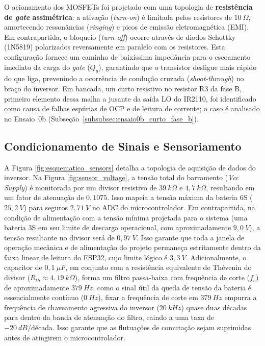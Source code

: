 O acionamento dos MOSFETs foi projetado com uma topologia de \textbf{resistência de \textit{gate} assimétrica}: a ativação (\textit{turn-on}) é limitada pelos resistores de $10 \: \Omega$, amortecendo ressonâncias (\textit{ringing}) e picos de emissão eletromagnética (EMI). Em contrapartida, o bloqueio (\textit{turn-off}) ocorre através de diodos Schottky (1N5819) polarizados reversamente em paralelo com os resistores. Esta configuração fornece um caminho de baixíssima impedância para o escoamento imediato da carga do \textit{gate} ($Q_g$), garantindo que o transistor desligue mais rápido do que liga, prevenindo a ocorrência de condução cruzada (\textit{shoot-through}) no braço do inversor. Em bancada, um curto resistivo no resistor R3 da fase B, primeiro elemento dessa malha a jusante da saída LO do IR2110, foi identificado como causa de falhas espúrias de OCP e de leitura de corrente; o caso é analisado no Ensaio~0b (Subseção~\ref{subsubsec:ensaio0b_curto_fase_b}).

\subsection{Condicionamento de Sinais e Sensoriamento}

A Figura \ref{fig:esquematico_sensors} detalha a topologia de aquisição de dados do inversor. Na Figura \ref{fig:sensor_voltage}, a tensão total do barramento (\textit{Vcc Supply}) é monitorada por um divisor resistivo de $39 \: k\Omega$ e $4,7 \: k\Omega$, resultando em um fator de atenuação de $0,1075$. Isso mapeia a tensão máxima da bateria 6S ($25,2 \: V$) para seguros $2,71 \: V$ no ADC do microcontrolador. Em contrapartida, na condição de alimentação com a tensão mínima projetada para o sistema (uma bateria 3S em seu limite de descarga operacional, com aproximadamente $9,0 \: V$), a tensão resultante no divisor será de $0,97 \: V$. Isso garante que toda a janela de operação mecânica e de alimentação do projeto permaneça estritamente dentro da faixa linear de leitura do ESP32, cujo limite lógico é $3,3 \: V$. Adicionalmente, o capacitor de $0,1 \: \mu F$, em conjunto com a resistência equivalente de Thévenin do divisor ($R_{th} \approx 4,19 \: k\Omega$), forma um filtro passa-baixa com frequência de corte ($f_c$) de aproximadamente $379 \: Hz$, como o sinal útil da queda de tensão da bateria é essencialmente contínuo ($0 \: Hz$), fixar a frequência de corte em $379 \: Hz$ empurra a frequência de chaveamento agressiva do inversor ($20 \: kHz$) quase duas décadas para dentro da banda de atenuação do filtro, caindo a uma taxa de $-20 \: dB/\text{década}$. Isso garante que as flutuações de comutação sejam suprimidas antes de atingirem o microcontrolador.

